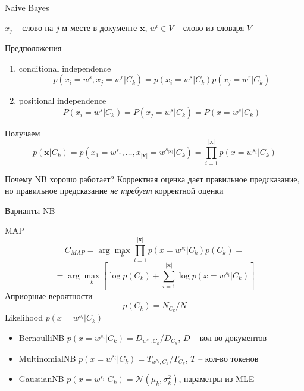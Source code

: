\documentclass[aspectratio=169]{beamer}
\begin{document}
\begin{frame}{Naive Bayes}

$x_j$ -- слово на $j$-м месте в документе $\mathbf{x}$,
$w^i \in V$ -- слово из словаря $V$

\vspace{1em}
Предположения
\begin{enumerate}
\item conditional independence 
\[
p(x_i=w^s, x_j=w^r | C_k) = p(x_i=w^s | C_k) p(x_j=w^r | C_k)
\]
\item positional independence
\[
P(x_i=w^s | C_k) = P(x_j=w^s | C_k) = P(x = w^s | C_k)
\]
\end{enumerate}

Получаем
\[
p(\mathbf{x} | C_k) = p(x_1=w^{s_1}, \ldots, x_{|\mathbf{x}|}=w^{s_{|\mathbf{x}|}} | C_k) = \prod_{i=1}^{|\mathbf{x}|} p(x = w^{s_i} | C_k)
\]

\begin{block}{Почему NB хорошо работает?}
Корректная оценка дает правильное предсказание, но правильное предсказание {\it не требует} корректной оценки
\end{block}

\end{frame}


\begin{frame}{Варианты NB}

MAP
\[
C_{MAP} = \arg \max_k \prod_{i=1}^{|\mathbf{x}|} p(x = w^{s_i} | C_k) p(C_k) = 
\]
\[
= \arg \max_k \left[ \log p(C_k) + \sum_{i=1}^{|\mathbf{x}|} \log p(x = w^{s_i} | C_k) \right]
\]
Априорные вероятности
\[
p(C_k) = N_{C_k}/{N}
\]
Likelihood $p(x = w^{s_i} | C_k)$
\begin{itemize}
\item BernoulliNB $p(x = w^{s_i} | C_k) = D_{w^{s_i}, C_k} / D_{C_k}$, $D$ -- кол-во документов
\item MultinomialNB $p(x = w^{s_i} | C_k) = T_{w^{s_i}, C_k} / T_{C_k}$, $T$ -- кол-во токенов
\item GaussianNB $p(x = w^{s_i} | C_k) = \mathcal{N}(\mu_k, \sigma_k^2)$, параметры из MLE
\end{itemize}

\end{frame}


\end{document}
